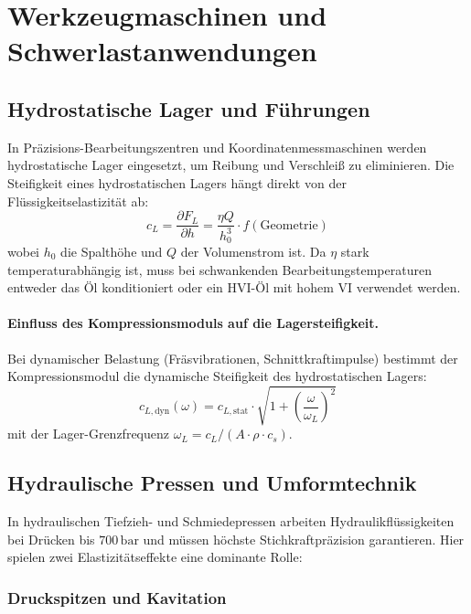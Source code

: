 ﻿\documentclass[a4paper,12pt]{scrreprt}
\theoremstyle{definition}
\begin{document}
\section{Werkzeugmaschinen und Schwerlastanwendungen}

\subsection{Hydrostatische Lager und Führungen}

In Präzisions-Bearbeitungszentren und Koordinatenmessmaschinen werden
hydrostatische Lager eingesetzt, um Reibung und Verschleiß zu eliminieren.
Die Steifigkeit eines hydrostatischen Lagers hängt direkt von der
Flüssigkeitselastizität ab:
\begin{equation}
  c_L = \frac{\partial F_L}{\partial h} = \frac{\eta Q}{h_0^3} \cdot f(\mathrm{Geometrie})
  \label{eq:lager_steifigkeit}
\end{equation}
wobei $h_0$ die Spalthöhe und $Q$ der Volumenstrom ist. Da $\eta$ stark
temperaturabhängig ist, muss bei schwankenden Bearbeitungstemperaturen
entweder das Öl konditioniert oder ein HVI-Öl mit hohem VI verwendet werden.

\paragraph{Einfluss des Kompressionsmoduls auf die Lagersteifigkeit.}
Bei dynamischer Belastung (Fräsvibrationen, Schnittkraftimpulse) bestimmt
der Kompressionsmodul die dynamische Steifigkeit des hydrostatischen Lagers:
\begin{equation}
  c_{L,\mathrm{dyn}}(\omega) = c_{L,\mathrm{stat}} \cdot
    \sqrt{1 + \left(\frac{\omega}{\omega_L}\right)^2}
  \label{eq:lager_dyn_steifigkeit}
\end{equation}
mit der Lager-Grenzfrequenz $\omega_L = c_L / (A \cdot \rho \cdot c_s)$.

\subsection{Hydraulische Pressen und Umformtechnik}

In hydraulischen Tiefzieh- und Schmiedepressen arbeiten Hydraulikflüssigkeiten
bei Drücken bis $700\,\mathrm{bar}$ und müssen höchste Stichkraftpräzision
garantieren. Hier spielen zwei Elastizitätseffekte eine dominante Rolle:

\subsubsection{Druckspitzen und Kavitation}
\end{document}
